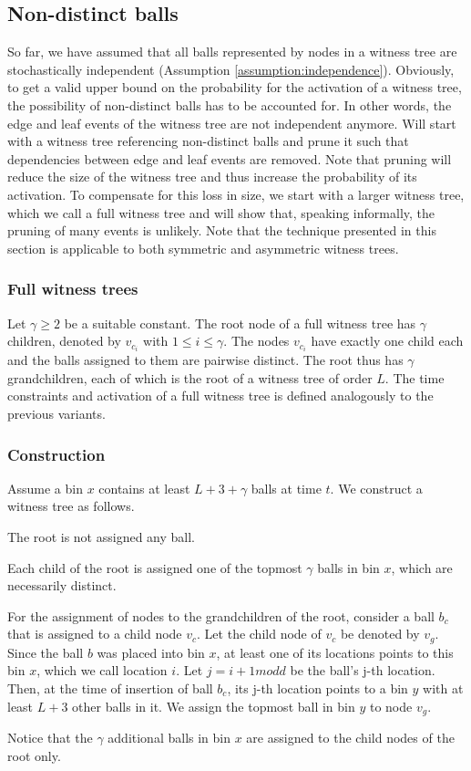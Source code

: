 \documentclass[a4paper,12pt]{article}
\begin{document}
\subsection{Non-distinct balls}
\label{sec:analysis:nondistinctBalls}
So far, we have assumed that all balls represented by nodes in a witness tree are stochastically independent (Assumption \ref{assumption:independence}). Obviously, to get a valid upper bound on the probability for the activation of a witness tree, the possibility of non-distinct balls has to be accounted for. In other words, the edge and leaf events of the witness tree are not independent anymore. Will start with a witness tree referencing non-distinct balls and prune it such that dependencies between edge and leaf events are removed. Note that pruning will reduce the size of the witness tree and thus increase the probability of its activation. To compensate for this loss in size, we start with a larger witness tree, which we call a full witness tree and will show that, speaking informally, the pruning of many events is unlikely. Note that the technique presented in this section is applicable to both symmetric and asymmetric witness trees. 

\subsubsection{Full witness trees}
\label{sec:analysis:FullWT}
Let $\gamma \geq 2$ be a suitable constant. The root node of a full witness tree has $\gamma$ children, denoted by $v_{c_i}$ with $1\leq i \leq \gamma$. The nodes $v_{c_i}$ have exactly one child each and the balls assigned to them are pairwise distinct. The root thus has $\gamma$ grandchildren, each of which is the root of a witness tree of order $L$. The time constraints and activation of a full witness tree is defined analogously to the previous variants.

\subsubsection{Construction}
\label{sec:analysis:constructionFullWT}
Assume a bin $x$ contains at least $L+3+\gamma$ balls at time $t$. We construct a witness tree as follows.
\begin{compactitem}
\item The root is not assigned any ball.
\item Each child of the root is assigned one of the topmost $\gamma$ balls in bin $x$, which are necessarily distinct.
\item For the assignment of nodes to the grandchildren of the root, consider a ball $b_c$ that is assigned to a child node $v_c$. Let the child node of $v_c$ be denoted by $v_g$. Since the ball $b$ was placed into bin $x$, at least one of its locations points to this bin $x$, which we call location $i$. Let $j = i+1 mod d$ be the ball's j-th location. Then, at the time of insertion of ball $b_c$, its j-th location points to a bin $y$ with at least $L+3$ other balls in it. We assign the topmost ball in bin $y$ to node $v_g$.
\end{compactitem}
Notice that the $\gamma$ additional balls in bin $x$ are assigned to the child nodes of the root only. 
\end{document}
